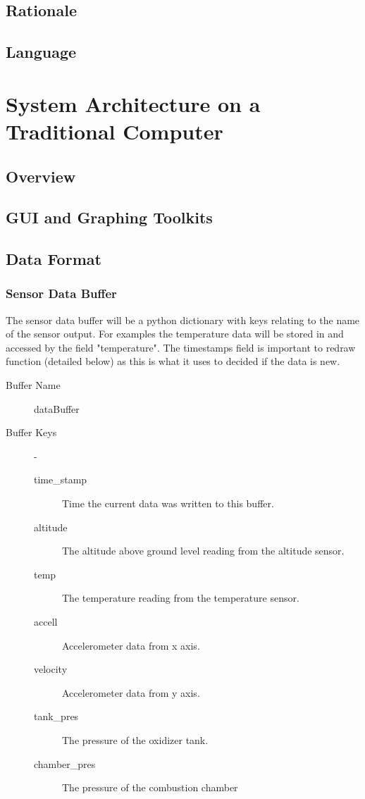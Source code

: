 \documentclass[10pt,draftclsnofoot,onecolumn,compsoc]{IEEEtran}
\begin{document}
\subsection{Rationale}
\subsection{Language}
\section{System Architecture on a Traditional Computer }
\subsection{Overview}
\subsection{GUI and Graphing Toolkits}
\subsection{Data Format}
\subsubsection{Sensor Data Buffer}
The sensor data buffer will be a python dictionary with keys relating to the name of the sensor output. For examples the temperature data will be stored in and accessed by the field "temperature".  The timestamps field is important to redraw function (detailed below) as this is what it uses to decided if the data is new.
\begin{description}
	\item[Buffer Name] dataBuffer
	\item[Buffer Keys]  -
		\begin{description}
			\item[time\_stamp] Time the current data was written to this buffer.
			\item[altitude] The altitude above ground level reading from the altitude sensor.
			\item[temp] The temperature reading from the temperature sensor.
			\item[accell] Accelerometer data from x axis.
			\item[velocity] Accelerometer data from y axis.
			\item[tank\_pres] The pressure of the oxidizer tank.
			\item[chamber\_pres] The pressure of the combustion chamber
		\end{description}
\end{description}
\end{document}
